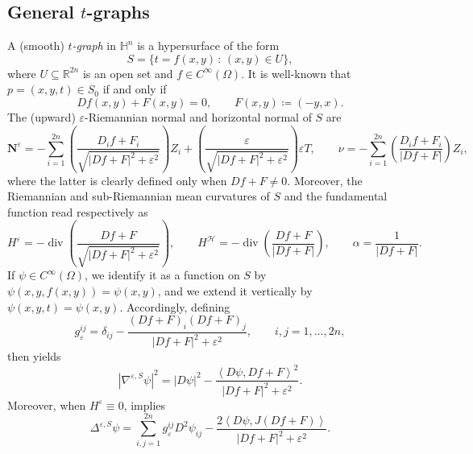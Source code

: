 \documentclass[11pt]{amsart}
\newcommand{\hhh}{{\mathcal{H}}}
\newcommand{\n}[1]{\nabla^\varepsilon_{ #1 }}
\newcommand{\vh}{\nu}
\newcommand{\rr}{{\mathbb{R}}}
\newcommand{\hh}{{\mathbb{H}}}
\newcommand{\Om}{\Omega}
\newcommand{\eps}{\varepsilon}
\renewcommand{\n}{\mathbf{N}}
\DeclareMathOperator{\divv}{div}
\theoremstyle{definition}
\theoremstyle{remark}
\numberwithin{equation}{section}
\begin{document}
\subsection{General $t$-graphs}\label{sec_tgraph}
A (smooth) \emph{$t$-graph} in $\hh^n$ is a hypersurface of the form 
\begin{equation*}
    S=\{t=f(x,y)\,:\,(x,y)\in U\},
\end{equation*}
where $U\subseteq\rr^{2n}$ is an open set and $f\in C^\infty(\Om)$. It is well-known \cite{pmc1, MR5029815} that $p=(x,y,t)\in S_0$ if and only if 
\begin{equation*}
    Df(x,y)+F(x,y)=0,\qquad F(x,y)\coloneq (-y,x).
\end{equation*}
The (upward) $\eps$-Riemannian normal and horizontal normal of $S$ are
\begin{equation*}
    \n^\eps=-\sum_{i=1}^{2n}\left(\frac{D_if+F_i}{\sqrt{|Df+F|^2+\eps^2}}\right)Z_i+\left(\frac{\eps}{\sqrt{|Df+F|^2+\eps^2}}\right)\eps T,\qquad \vh=-\sum_{i=1}^{2n}\left(\frac{D_if+F_i}{|Df+F|}\right)Z_i,
\end{equation*}
where the latter is clearly defined only when $Df+F\neq 0$.
Moreover, the Riemannian and sub-Riemannian mean curvatures of $S$ and the fundamental function read respectively as 
\begin{equation*}
    H^\eps=-\divv\left(\frac{Df+F}{\sqrt{|Df+F|^2+\eps^2}}\right),\qquad   H^\hhh=-\divv\left(\frac{Df+F}{|Df+F|}\right),\qquad\alpha=\frac{1}{|Df+F|}.
\end{equation*}
If $\psi\in C^\infty(\Om)$, we identify it as a function on $S$ by $\psi(x,y,f(x,y))=\psi(x,y)$, and we extend it vertically by $\psi(x,y,t)=\psi(x,y)$. Accordingly, defining
\begin{equation*}
    g^{ij}_\eps=\delta_{ij}-\frac{(Df+F)_i(Df+F)_j}{|Df+F|^2+\eps^2},\qquad i,j=1,\ldots,2n,
\end{equation*}
then
\cite[(3.8)]{MR5029815} yields
\begin{equation}\label{normgradtgraficogenerale}
    \left|\nabla^{\eps,S}\psi\right|^2=|D\psi|^2-\frac{\left\langle D\psi,Df+F\right\rangle^2}{|Df+F|^2+\eps^2}.
\end{equation}
    Moreover, when $H^\eps\equiv 0$, \cite[(3.8)]{MR5029815} implies
    \begin{equation}\label{laplbelttgraficogenerale}
        \Delta^{\eps,S}\psi=\sum_{i,j=1}^{2n}g^{ij}_\eps D^2\psi_{ij}-\frac{2\left\langle D\psi,J(Df+F)\right\rangle}{|Df+F|^2+\eps^2}.
    \end{equation}
\end{document}
